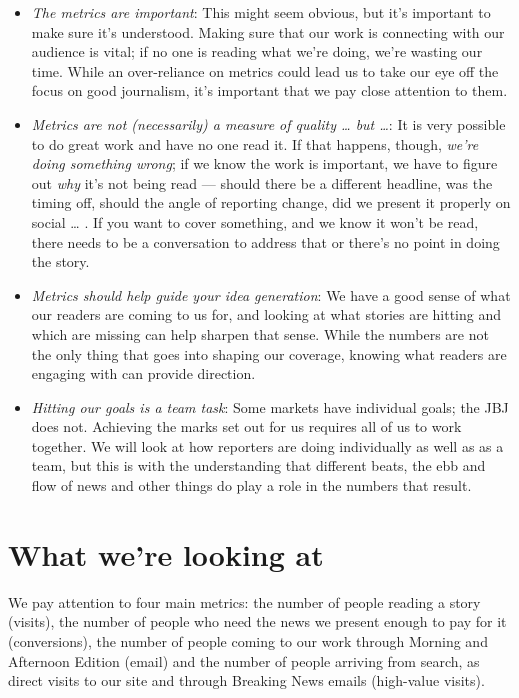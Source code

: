 \documentclass[
  11pt,
  american,
  letterpaperpaper,
  extrafontsizes,onecolumn,openright
  ]{memoir}
\providecommand{\tightlist}{%
  \setlength{\itemsep}{0pt}\setlength{\parskip}{0pt}}
\begin{document}
\begin{itemize}
\tightlist
\item
  \emph{The metrics are important}: This might seem obvious, but it's important to make sure it's understood. Making sure that our work is connecting with our audience is vital; if no one is reading what we're doing, we're wasting our time. While an over-reliance on metrics could lead us to take our eye off the focus on good journalism, it's important that we pay close attention to them.
\item
  \emph{Metrics are not (necessarily) a measure of quality \ldots{} but \ldots{}}: It is very possible to do great work and have no one read it. If that happens, though, \emph{we're doing something wrong}; if we know the work is important, we have to figure out \emph{why} it's not being read --- should there be a different headline, was the timing off, should the angle of reporting change, did we present it properly on social \ldots{} . If you want to cover something, and we know it won't be read, there needs to be a conversation to address that or there's no point in doing the story.
\item
  \emph{Metrics should help guide your idea generation}: We have a good sense of what our readers are coming to us for, and looking at what stories are hitting and which are missing can help sharpen that sense. While the numbers are not the only thing that goes into shaping our coverage, knowing what readers are engaging with can provide direction.
\item
  \emph{Hitting our goals is a team task}: Some markets have individual goals; the JBJ does not. Achieving the marks set out for us requires all of us to work together. We will look at how reporters are doing individually as well as as a team, but this is with the understanding that different beats, the ebb and flow of news and other things do play a role in the numbers that result.
\end{itemize}

\hypertarget{what-were-looking-at}{%
\section*{What we're looking at}\label{what-were-looking-at}}

We pay attention to four main metrics: the number of people reading a story (visits), the number of people who need the news we present enough to pay for it (conversions), the number of people coming to our work through Morning and Afternoon Edition (email) and the number of people arriving from search, as direct visits to our site and through Breaking News emails (high-value visits).
\end{document}
